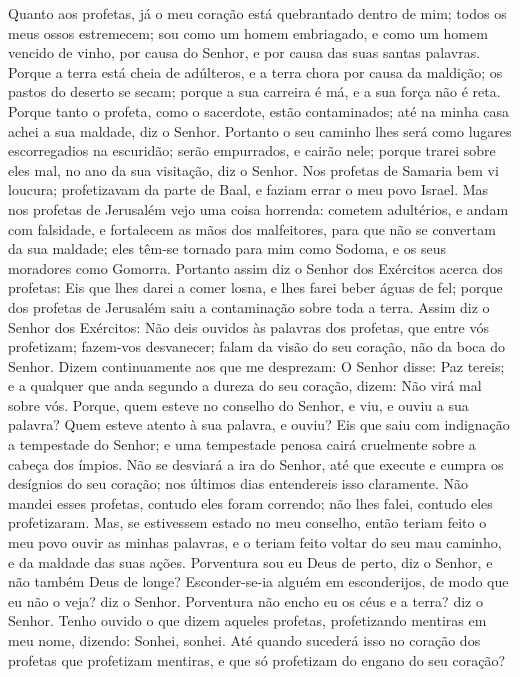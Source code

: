 Quanto aos profetas, já o meu coração está quebrantado dentro de
mim; todos os meus ossos estremecem; sou como um homem embriagado, e
como um homem vencido de vinho, por causa do Senhor, e por causa das
suas santas palavras. Porque a terra está cheia de adúlteros,
e a terra chora por causa da maldição; os pastos do deserto se
secam; porque a sua carreira é má, e a sua força não é reta.
Porque tanto o profeta, como o sacerdote, estão contaminados;
até na minha casa achei a sua maldade, diz o Senhor. Portanto
o seu caminho lhes será como lugares escorregadios na escuridão;
serão empurrados, e cairão nele; porque trarei sobre eles mal, no
ano da sua visitação, diz o Senhor. Nos profetas de Samaria
bem vi loucura; profetizavam da parte de Baal, e faziam errar o meu
povo Israel. Mas nos profetas de Jerusalém vejo uma coisa
horrenda: cometem adultérios, e andam com falsidade, e fortalecem as
mãos dos malfeitores, para que não se convertam da sua maldade; eles
têm-se tornado para mim como Sodoma, e os seus moradores como
Gomorra. Portanto assim diz o Senhor dos Exércitos acerca dos
profetas: Eis que lhes darei a comer losna, e lhes farei beber águas
de fel; porque dos profetas de Jerusalém saiu a contaminação sobre
toda a terra. Assim diz o Senhor dos Exércitos: Não deis
ouvidos às palavras dos profetas, que entre vós profetizam;
fazem-vos desvanecer; falam da visão do seu coração, não da boca do
Senhor. Dizem continuamente aos que me desprezam: O Senhor
disse: Paz tereis; e a qualquer que anda segundo a dureza do seu
coração, dizem: Não virá mal sobre vós. Porque, quem esteve
no conselho do Senhor, e viu, e ouviu a sua palavra? Quem esteve
atento à sua palavra, e ouviu? Eis que saiu com indignação a
tempestade do Senhor; e uma tempestade penosa cairá cruelmente sobre
a cabeça dos ímpios. Não se desviará a ira do Senhor, até que
execute e cumpra os desígnios do seu coração; nos últimos dias
entendereis isso claramente. Não mandei esses profetas,
contudo eles foram correndo; não lhes falei, contudo eles
profetizaram. Mas, se estivessem estado no meu conselho,
então teriam feito o meu povo ouvir as minhas palavras, e o teriam
feito voltar do seu mau caminho, e da maldade das suas ações.
Porventura sou eu Deus de perto, diz o Senhor, e não também
Deus de longe? Esconder-se-ia alguém em esconderijos, de modo
que eu não o veja? diz o Senhor. Porventura não encho eu os céus e a
terra? diz o Senhor. Tenho ouvido o que dizem aqueles
profetas, profetizando mentiras em meu nome, dizendo: Sonhei,
sonhei. Até quando sucederá isso no coração dos profetas que
profetizam mentiras, e que só profetizam do engano do seu coração?
